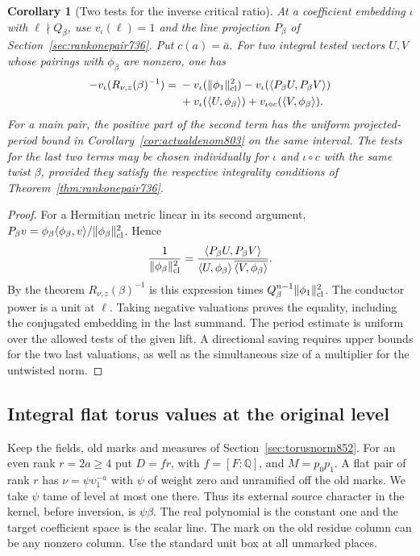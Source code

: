 \documentclass[a4paper,11pt]{article}
\newtheorem{corollary}[proposition]{Corollary}
\theoremstyle{definition}
\theoremstyle{remark}
\numberwithin{equation}{section}
\begin{document}
\begin{corollary}[Two tests for the inverse critical ratio]
\leavevmode\label{cor:torusvaluation852}
At a coefficient embedding \(\iota\) with \(\ell\nmid Q_\beta\),
use \(v_\iota(\ell)=1\) and the line projection \(P_\beta\) of
Section~\ref{sec:rankonepair736}. Put \(c(a)=\bar a\).
For two integral tested vectors \(U,V\) whose pairings with
\(\phi_\beta\) are nonzero, one has
\[
\begin{split}
 -v_\iota(R_{\nu,z}(\beta)^{-1})
   ={}&-v_\iota(\|\phi_1\|_{\rm cl}^2)
       -v_\iota(\langle P_\beta U,P_\beta V\rangle)\\
     &+v_\iota(\langle U,\phi_\beta\rangle)
       +v_{\iota\circ c}(\langle V,\phi_\beta\rangle).
\end{split}
\]
For a main pair, the positive part of the second term has the
uniform projected-period bound in Corollary~\ref{cor:actualdenom803}
on the same interval. The tests for the last two terms may
be chosen individually for \(\iota\) and \(\iota\circ c\) with
the same twist \(\beta\), provided they satisfy the respective
integrality conditions of Theorem~\ref{thm:rankonepair736}.
\end{corollary}
\begin{proof}
For a Hermitian metric linear in its second argument,
\(P_\beta v=\phi_\beta\langle\phi_\beta,v\rangle/
\|\phi_\beta\|_{\rm cl}^2\). Hence
\[
 \frac1{\|\phi_\beta\|_{\rm cl}^2}
    =\frac{\langle P_\beta U,P_\beta V\rangle}
            {\langle U,\phi_\beta\rangle\,
             \overline{\langle V,\phi_\beta\rangle}}.
\]
By the theorem \(R_{\nu,z}(\beta)^{-1}\) is this expression
times \(Q_\beta^{n-1}\|\phi_1\|_{\rm cl}^2\). The conductor
power is a unit at \(\ell\). Taking negative valuations proves
the equality, including the conjugated embedding in the last
summand. The period estimate is uniform over the allowed
tests of the given lift. A directional saving requires upper
bounds for the two last valuations, as well as the simultaneous
size of a multiplier for the untwisted norm.
\end{proof}
\clearpage

\subsection{Integral flat torus values at the original level}
\label{sec:flattorus853}
Keep the fields, old marks and measures of
Section~\ref{sec:torusnorm852}. For an even rank \(r=2a\ge4\)
put \(D=fr\), with \(f=[F:\mathbb Q]\), and \(M=p_0p_1\).
A flat pair of rank \(r\) has \(\nu=\psi\upsilon_1^{-a}\)
with \(\psi\) of weight zero and unramified off the old marks.
We take \(\psi\) tame of level at most one there. Thus its
external source character in the kernel, before inversion,
is \(\psi\beta\). The real polynomial is the constant one
and the target coefficient space is the scalar line. The
mark on the old residue column can be any nonzero column.
Use the standard unit box at all unmarked places.
\end{document}
